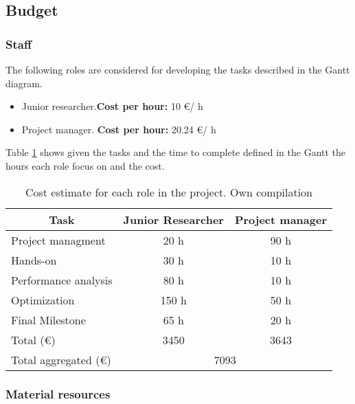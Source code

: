 \subsection{Budget}

\subsubsection{Staff}

The following roles are considered for developing the tasks described in the Gantt diagram.

\begin{itemize}
  \item Junior researcher.\textbf{Cost per hour: } 10 \euro / h
  \item Project manager. \textbf{Cost per hour:} 20.24 \euro / h
\end{itemize}

Table \ref{tab:staffcost} shows given the tasks and the time to complete defined in the Gantt the hours each role focus on and the cost.

\begin{table}[htbp!]
\centering
\begin{tabular}{|l|c|c|}
\hline
\multicolumn{1}{|c|}{Task} & Junior Researcher & Project manager \\ \hline
Project managment          & 20 h              & 90 h            \\ \hline
Hands-on                   & 30 h              & 10 h            \\ \hline
Performance analysis       & 80 h              & 10 h            \\ \hline
Optimization               & 150 h             & 50 h            \\ \hline
Final Milestone            & 65 h              & 20 h            \\ \hline
Total (\euro)              & 3450              & 3643            \\ \hline
Total aggregated (\euro)    & \multicolumn{2}{c|}{7093}           \\ \hline
\end{tabular}
\caption[Cost estimate for each role in the project.]{Cost estimate for each role in the project. Own compilation}
\label{tab:staffcost}
\end{table}


\subsubsection{Material resources}

